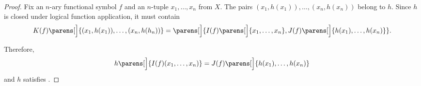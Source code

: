 \begin{proof}
  Fix an \( n \)-ary functional symbol \( f \) and an \( n \)-tuple \( x_1, \ldots, x_n \) from \( X \). The pairs \( (x_1, h(x_1)), \ldots, (x_n, h(x_n)) \) belong to \( h \). Since \( h \) is closed under logical function application, it must contain
  \begin{equation*}
    K(f)\parens[\Big]{ (x_1, h(x_1)), \ldots, (x_n, h(h_n)) }
    =
    \parens[\Big]{ I(f)\parens[\Big]{ x_1, \ldots, x_n }, J(f)\parens[\Big]{ h(x_1), \ldots, h(x_n) } }.
  \end{equation*}

  Therefore,
  \begin{equation*}
    h\parens[\Big]{ I(f)(x_1, \ldots, x_n) } = J(f)\parens[\Big]{ h(x_1), \ldots, h(x_n) }
  \end{equation*}
  and \( h \) satisfies .
\end{proof}

